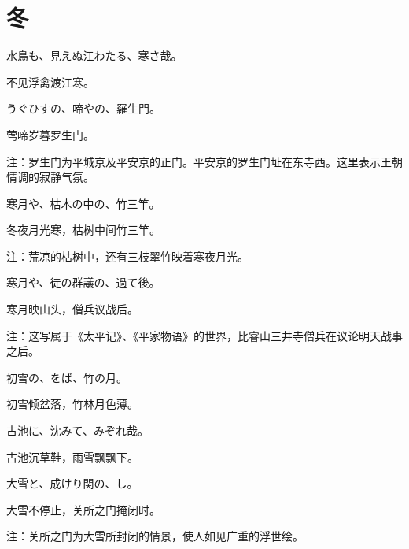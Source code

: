 \section{\FK 冬}

\setcounter{haikucounter}{0}

\begin{haiku}
    {\FH 水鳥も、見えぬ江わたる、寒さ哉。}

    {\FK 不见浮禽渡江寒。}
\end{haiku}

\begin{haiku}
    {\FH うぐひすの、啼やの、羅生門。}

    {\FK 莺啼岁暮罗生门。}

    {\FT 注：罗生门为平城京及平安京的正门。平安京的罗生门址在东寺西。这里表示王朝情调的寂静气氛。}
\end{haiku}

\begin{haiku}
    {\FH 寒月や、枯木の中の、竹三竿。}

    {\FK 冬夜月光寒，枯树中间竹三竿。}

    {\FT 注：荒凉的枯树中，还有三枝翠竹映着寒夜月光。}
\end{haiku}

\begin{haiku}
    {\FH 寒月や、徒の群議の、過て後。}

    {\FK 寒月映山头，僧兵议战后。}

    {\FT 注：这写属于《太平记》、《平家物语》的世界，比睿山三井寺僧兵在议论明天战事之后。}
\end{haiku}

\begin{haiku}
    {\FH 初雪の、をば、竹の月。}

    {\FK 初雪倾盆落，竹林月色薄。}
\end{haiku}

\begin{haiku}
    {\FH 古池に、沈みて、みぞれ哉。}

    {\FK 古池沉草鞋，雨雪飘飘下。}
\end{haiku}

\begin{haiku}
    {\FH 大雪と、成けり関の、し。}

    {\FK 大雪不停止，关所之门掩闭时。}

    {\FT 注：关所之门为大雪所封闭的情景，使人如见广重的浮世绘。}
\end{haiku}

